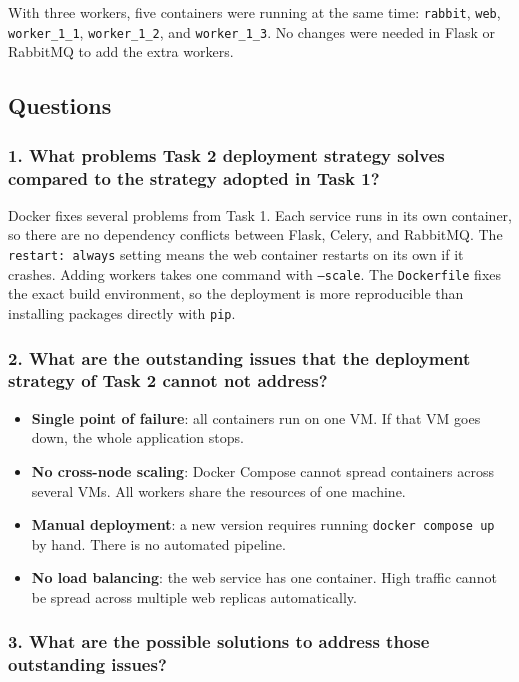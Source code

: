 \documentclass[11pt,a4paper]{article}
\begin{document}
With three workers, five containers were running at the same time:
\texttt{rabbit}, \texttt{web}, \texttt{worker\_1\_1}, \texttt{worker\_1\_2}, and
\texttt{worker\_1\_3}. No changes were needed in Flask or RabbitMQ to add the
extra workers.

\subsection{Questions}

\subsubsection*{1. What problems Task 2 deployment strategy solves compared to the strategy adopted in
Task 1?}

Docker fixes several problems from Task 1. Each service runs in its own container,
so there are no dependency conflicts between Flask, Celery, and RabbitMQ. The
\texttt{restart: always} setting means the web container restarts on its own if it
crashes. Adding workers takes one command with \texttt{--scale}. The \texttt{Dockerfile}
fixes the exact build environment, so the deployment is more reproducible than
installing packages directly with \texttt{pip}.

\subsubsection*{2. What are the outstanding issues that the deployment strategy of Task 2 cannot not
address?}

\begin{itemize}[leftmargin=1.5cm]
  \item \textbf{Single point of failure}: all containers run on one VM. If that VM
        goes down, the whole application stops.
  \item \textbf{No cross-node scaling}: Docker Compose cannot spread containers
        across several VMs. All workers share the resources of one machine.
  \item \textbf{Manual deployment}: a new version requires running
        \texttt{docker compose up} by hand. There is no automated pipeline.
  \item \textbf{No load balancing}: the web service has one container. High traffic
        cannot be spread across multiple web replicas automatically.
\end{itemize}

\subsubsection*{3. What are the possible solutions to address those outstanding issues?}
\end{document}

